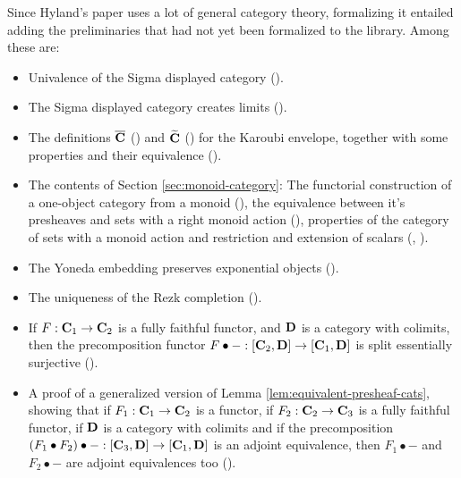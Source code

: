 Since Hyland's paper uses a lot of general category theory, formalizing it entailed adding the preliminaries that had not yet been formalized to the library. Among these are:
\begin{itemize}
  \item Univalence of the Sigma displayed category ().
  \item The Sigma displayed category creates limits ().
  \item The definitions $ \overline {\mathbf{C}} $ () and $ \widetilde {\mathbf{C}} $ () for the Karoubi envelope, together with some properties and their equivalence ().
  \item The contents of Section \ref{sec:monoid-category}: The functorial construction of a one-object category from a monoid (), the equivalence between it's presheaves and sets with a right monoid action (), properties of the category of sets with a monoid action and restriction and extension of scalars (, ).
  \item The Yoneda embedding preserves exponential objects ().
  \item The uniqueness of the Rezk completion ().
  \item If $ F : \mathbf{C}_1 \to \mathbf{C}_2 $ is a fully faithful functor, and $ \mathbf{D} $ is a category with colimits, then the precomposition functor $ F \bullet - : [\mathbf{C}_2, \mathbf{D}] \to [\mathbf{C}_1, \mathbf{D}] $ is split essentially surjective ().
  \item A proof of a generalized version of Lemma \ref{lem:equivalent-presheaf-cats}, showing that if $ F_1 : \mathbf{C}_1 \to \mathbf{C}_2 $ is a functor, if $ F_2 : \mathbf{C}_2 \to \mathbf{C}_3 $ is a fully faithful functor, if $ \mathbf{D} $ is a category with colimits and if the precomposition $ (F_1 \bullet F_2) \bullet - : [\mathbf{C}_3, \mathbf{D}] \to [\mathbf{C}_1, \mathbf{D}] $ is an adjoint equivalence, then $ F_1 \bullet - $ and $ F_2 \bullet - $ are adjoint equivalences too ().

\end{itemize}
